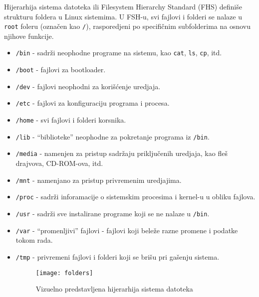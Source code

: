 Hijerarhija sistema datoteka ili Filesystem Hierarchy Standard (FHS) definiše strukturu foldera u Linux sistemima. U FSH-u, svi fajlovi i folderi se nalaze u \texttt{root} foleru (označen kao \texttt{/}), rasporedjeni po specifičnim subfolderima na osnovu njihove funkcije.
\begin{itemize}
\item \texttt{/bin} - sadrži neophodne programe na sistemu, kao \texttt{cat}, \texttt{ls}, \texttt{cp}, itd.

\item \texttt{/boot} - fajlovi za bootloader.

\item \texttt{/dev} - fajlovi neophodni za korišćenje uredjaja.

\item \texttt{/etc} - fajlovi za konfiguraciju programa i procesa.

\item \texttt{/home} - svi fajlovi i folderi korsnika.

\item \texttt{/lib} - ``biblioteke'' neophodne za pokretanje programa iz \texttt{/bin}.

\item \texttt{/media} - namenjen za pristup sadržaju priključenih uredjaja, kao fleš drajvova, CD-ROM-ova, itd.

\item \texttt{/mnt} - namenjano za pristup privremenim uredjajima.

\item \texttt{/proc} - sadrži inforamacije o sistemskim procesima i kernel-u u obliku fajlova.

\item \texttt{/usr} - sadrži sve instalirane programe koji se ne nalaze u \texttt{/bin}.

\item \texttt{/var} - ``promenljivi'' fajlovi - fajlovi koji beleže razne promene i podatke tokom rada.

\item \texttt{/tmp} - privremeni fajlovi i folderi koji se brišu pri gašenju sistema.

\begin{figure}[H]
	\centering
	\texttt{[image: folders]}
	\caption{Vizuelno predstavljena hijerarhija sistema datoteka}
\end{figure}

\end{itemize}